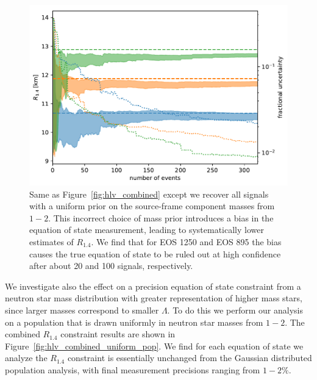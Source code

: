 \begin{figure}[ht]
\includegraphics[width=\textwidth]{Figures/eos-meas/final_pop_hlv_combined_radius_3eos_uniform_prior_seed0_bw0p35.pdf}
\caption{Same as Figure~\ref{fig:hlv_combined} except we recover all signals with a uniform prior on the source-frame component masses from $1-2$\msun. This incorrect choice of mass prior introduces a bias in the equation of state measurement, leading to systematically lower estimates of $R_{1.4}$. We find that for EOS 1250 and EOS 895 the bias causes the true equation of state to be ruled out at high confidence after about 20 and 100 signals, respectively.}
\label{fig:hlv_combined_uniform_prior}
\end{figure}

We investigate also the effect on a precision equation of state constraint from a neutron star mass distribution with greater representation of higher mass stars, since larger masses correspond to smaller $\Lambda$. To do this we perform our analysis on a population that is drawn uniformly in neutron star masses from $1-2$\msun. The combined $R_{1.4}$ constraint results are shown in Figure~\ref{fig:hlv_combined_uniform_pop}. We find for each equation of state we analyze the $R_{1.4}$ constraint is essentially unchanged from the Gaussian distributed population analysis, with final measurement precisions ranging from $1-2\%$.


